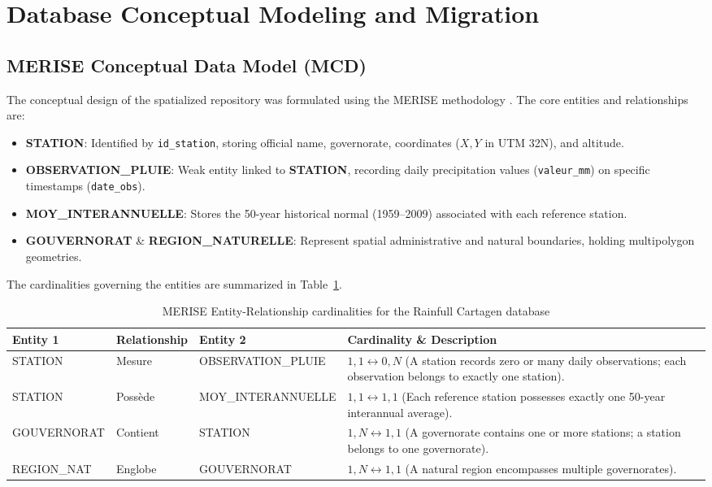 \documentclass[12pt,a4paper]{report}
\begin{document}
\section{Database Conceptual Modeling and Migration}

\subsection{MERISE Conceptual Data Model (MCD)}
The conceptual design of the spatialized repository was formulated using the MERISE methodology \cite{baptiste2024}. The core entities and relationships are:
\begin{itemize}
  \item \textbf{STATION}: Identified by \texttt{id\_station}, storing official name, governorate, coordinates ($X, Y$ in UTM 32N), and altitude.
  \item \textbf{OBSERVATION\_PLUIE}: Weak entity linked to \textbf{STATION}, recording daily precipitation values (\texttt{valeur\_mm}) on specific timestamps (\texttt{date\_obs}).
  \item \textbf{MOY\_INTERANNUELLE}: Stores the 50-year historical normal (1959--2009) associated with each reference station.
  \item \textbf{GOUVERNORAT} \& \textbf{REGION\_NATURELLE}: Represent spatial administrative and natural boundaries, holding multipolygon geometries.
\end{itemize}

The cardinalities governing the entities are summarized in Table~\ref{tab:cardinalities}.

\begin{table}[htbp]
\centering
\caption{MERISE Entity-Relationship cardinalities for the Rainfull Cartagen database}
\label{tab:cardinalities}
\small
\begin{tabular}{lllp{6cm}}
\toprule
\textbf{Entity 1} & \textbf{Relationship} & \textbf{Entity 2} & \textbf{Cardinality \& Description} \\
\midrule
STATION & Mesure & OBSERVATION\_PLUIE & $1,1 \longleftrightarrow 0,N$ (A station records zero or many daily observations; each observation belongs to exactly one station). \\
STATION & Possède & MOY\_INTERANNUELLE & $1,1 \longleftrightarrow 1,1$ (Each reference station possesses exactly one 50-year interannual average). \\
GOUVERNORAT & Contient & STATION & $1,N \longleftrightarrow 1,1$ (A governorate contains one or more stations; a station belongs to one governorate). \\
REGION\_NAT & Englobe & GOUVERNORAT & $1,N \longleftrightarrow 1,1$ (A natural region encompasses multiple governorates). \\
\bottomrule
\end{tabular}
\end{table}
\end{document}
